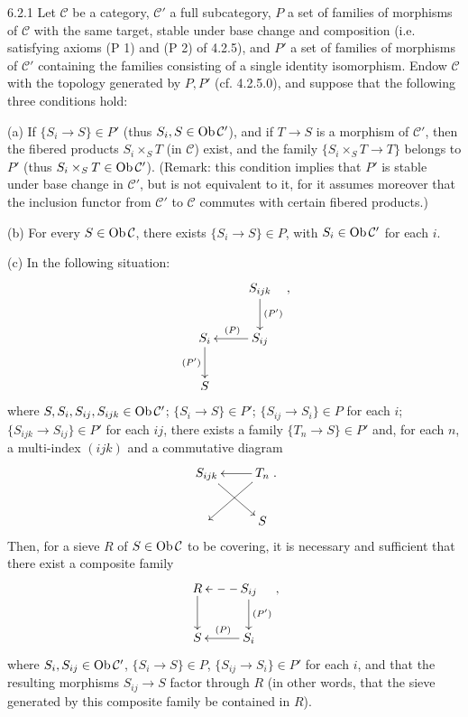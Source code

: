 \begin{proposition}{6.2.1}\label{IV.6.2.1}
Let \(\mathcal C\) be a category, \(\mathcal C'\)
a full subcategory, \(P\) a set of families of
morphisms of \(\mathcal C\) with the same target,
stable under base change and composition
(i.e. satisfying axioms (P 1) and (P 2) of 4.2.5),
and \(P'\) a set of families of morphisms of
\(\mathcal C'\) containing the families consisting
of a single identity isomorphism.
Endow \(\mathcal C\) with the topology generated
by \(P,P'\) (cf. 4.2.5.0), and suppose that the
following three conditions hold:

(a) If \(\{S_i\to S\}\in P'\)
(thus \(S_i,S\in\operatorname{Ob}\mathcal C'\)), and if
\(T\to S\) is a morphism of \(\mathcal C'\),
then the fibered products \(S_i\times_S T\)
(in \(\mathcal C\)) exist, and the family
\(\{S_i\times_S T\to T\}\) belongs to \(P'\)
(thus \(S_i\times_S T\in\operatorname{Ob}\mathcal C'\)).
(Remark: this condition implies that \(P'\)
is stable under base change in \(\mathcal C'\),
but is not equivalent to it, for it assumes
moreover that the inclusion functor from
\(\mathcal C'\) to \(\mathcal C\) commutes
with certain fibered products.)

(b) For every \(S\in\operatorname{Ob}\mathcal C\), there
exists \(\{S_i\to S\}\in P\), with
\(S_i\in\operatorname{Ob}\mathcal C'\) for each \(i\).

(c) In the following situation:
\[
\xymatrix{
 & S_{ijk}\ar[d]^{(P')}\\
S_i\ar[d]_{(P')} & S_{ij}\ar[l]_{(P)}\\
S & },
\]
where \(S,S_i,S_{ij},S_{ijk}\in\operatorname{Ob}\mathcal C'\);
\(\{S_i\to S\}\in P'\);
\(\{S_{ij}\to S_i\}\in P\) for each \(i\);
\(\{S_{ijk}\to S_{ij}\}\in P'\) for each \(ij\),
there exists a family \(\{T_n\to S\}\in P'\)
and, for each \(n\), a multi-index \((ijk)\)
and a commutative diagram
\[
\xymatrix{S_{ijk}\ar[dr] & T_n\ar[l]\ar[dl]\\ & S }.
\]
Then, for a sieve \(R\) of \(S\in\operatorname{Ob}\mathcal C\)
to be covering, it is necessary and sufficient
that there exist a composite family
\[
\xymatrix{
R\ar[d] & S_{ij}\ar@{-->}[l]\ar[d]^{(P')}\\
S & S_i\ar[l]_{(P)} },
\]
where \(S_i,S_{ij}\in\operatorname{Ob}\mathcal C'\),
\(\{S_i\to S\}\in P\), \(\{S_{ij}\to S_i\}\in P'\)
for each \(i\), and that the resulting morphisms
\(S_{ij}\to S\) factor through \(R\)
(in other words, that the sieve generated by
this composite family be contained in \(R\)).
\end{proposition}
